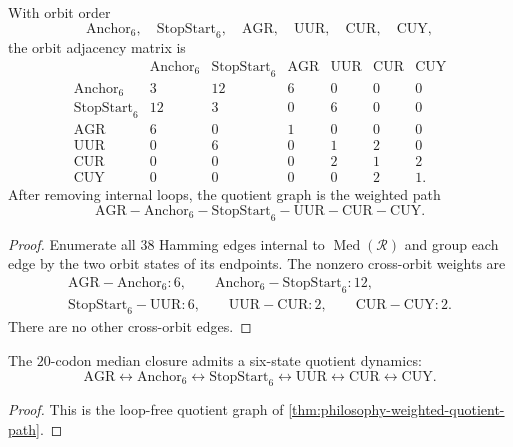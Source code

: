 \begin{theorem}
\label{thm:philosophy-weighted-quotient-path}
With orbit order
$$
  \mathrm{Anchor}_{6},\quad
  \mathrm{StopStart}_{6},\quad
  \mathrm{AGR},\quad
  \mathrm{UUR},\quad
  \mathrm{CUR},\quad
  \mathrm{CUY},
$$
the orbit adjacency matrix is
$$
\begin{array}{c|rrrrrr}
 & \mathrm{Anchor}_{6} & \mathrm{StopStart}_{6} & \mathrm{AGR}
 & \mathrm{UUR} & \mathrm{CUR} & \mathrm{CUY}\\
\hline
\mathrm{Anchor}_{6} & 3 & 12 & 6 & 0 & 0 & 0\\
\mathrm{StopStart}_{6} & 12 & 3 & 0 & 6 & 0 & 0\\
\mathrm{AGR} & 6 & 0 & 1 & 0 & 0 & 0\\
\mathrm{UUR} & 0 & 6 & 0 & 1 & 2 & 0\\
\mathrm{CUR} & 0 & 0 & 0 & 2 & 1 & 2\\
\mathrm{CUY} & 0 & 0 & 0 & 0 & 2 & 1.
\end{array}
$$
After removing internal loops, the quotient graph is the weighted path
$$
  \mathrm{AGR}
  -
  \mathrm{Anchor}_{6}
  -
  \mathrm{StopStart}_{6}
  -
  \mathrm{UUR}
  -
  \mathrm{CUR}
  -
  \mathrm{CUY}.
$$
\end{theorem}
\begin{proof}
Enumerate all $38$ Hamming edges internal to
$\operatorname{Med}(\mathcal{R})$ and group each edge by the two orbit
states of its endpoints. The nonzero cross-orbit weights are
$$
\begin{gathered}
  \mathrm{AGR}-\mathrm{Anchor}_{6}:6,\qquad
  \mathrm{Anchor}_{6}-\mathrm{StopStart}_{6}:12,\\
  \mathrm{StopStart}_{6}-\mathrm{UUR}:6,\qquad
  \mathrm{UUR}-\mathrm{CUR}:2,\qquad
  \mathrm{CUR}-\mathrm{CUY}:2.
\end{gathered}
$$
There are no other cross-orbit edges.
\end{proof}

\begin{corollary}
\label{cor:philosophy-six-state-codon-window-automaton}
The $20$-codon median closure admits a six-state quotient dynamics:
$$
  \mathrm{AGR}
  \longleftrightarrow
  \mathrm{Anchor}_{6}
  \longleftrightarrow
  \mathrm{StopStart}_{6}
  \longleftrightarrow
  \mathrm{UUR}
  \longleftrightarrow
  \mathrm{CUR}
  \longleftrightarrow
  \mathrm{CUY}.
$$
\end{corollary}
\begin{proof}
This is the loop-free quotient graph of
\autoref{thm:philosophy-weighted-quotient-path}.
\end{proof}

